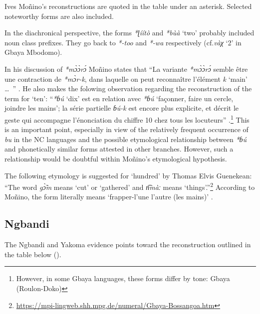 Ives Moñino’s reconstructions \citep{Moñino1995} are quoted in the table under an asterisk. Selected noteworthy forms are also included.

In the diachronical perspective, the forms \textit{*ɭíítò} and \textit{*bùà} ‘two’ probably included noun class prefixes. They go back to \textit{*-too} and \textit{*-wa} respectively (cf.\textit{vàχ} ‘2’ in Gbaya Mbodomo).

In his discussion of \textit{*m{\`{ɔ}}{\`{ɔ}}r{\'{ɔ}}} Moñino states that “La variante \textit{*m{\`{ɔ}}{\`{ɔ}}r{\'{ɔ}}} semble être une contraction de \textit{*m{\`{ɔ}}r-k{}}, dans laquelle on peut reconnaître l’élément \textit{k{}} ‘main’ …~” \citep[655]{Moñino1995}. He also makes the folowing observation regarding the reconstruction of the term for ‘ten’: “\textit{*ɓú} ‘dix’ est en relation avec \textit{*ɓú} ‘façonner, faire un cercle, joindre les mains’; la série partielle \textit{ɓú-k{}} est encore plus explicite, et décrit le geste qui accompagne l’énonciation du chiffre 10 chez tous les locuteurs” \citep[656]{Moñino1995}.\footnote{However, in some Gbaya languages, these forms differ by tone: Gbaya (Roulon-Doko)  } This is an important point, especially in view of the relatively frequent occurrence of \textit{bu} in the NC languages and the possible etymological relationship between \textit{*ɓú} and phonetically similar forms attested in other branches. However, such a relationship would be doubtful within Moñino’s etymological hypothesis. 

The following etymology is suggested for ‘hundred’ by Thomas Elvis Guenekean: “The word \textit{g{\`{\~ɔ}}m} means ‘cut’ or ‘gathered’ and \textit{n͡màː} means ‘things’.”\footnote{\url{https://mpi-lingweb.shh.mpg.de/numeral/Gbaya-Bossangoa.htm}} According to Moñino, the form literally means ‘frapper-l’une l’autre (les mains)’ \citep[657]{Moñino1995}.


\subsection{Ngbandi}%
The Ngbandi and Yakoma evidence points toward the reconstruction outlined in the table below ().

